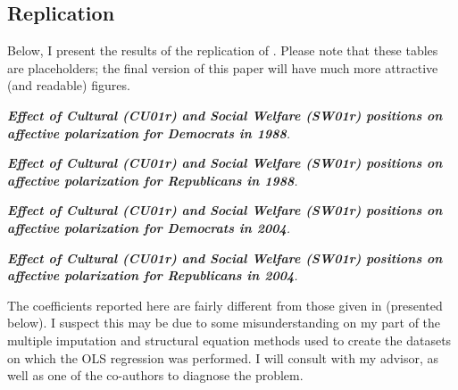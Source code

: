 \documentclass[12pt]{article}
\begin{document}
\subsection{Replication}

Below, I present the results of the replication of \citeauthor{iyengar2012affect}. Please note that these tables are placeholders; the final version of this paper will have much more attractive (and readable) figures.
\begin{table}[H]

\caption{\label{table} \textit{\textbf{Effect of Cultural (CU01r) and Social Welfare (SW01r) positions on affective polarization for Democrats in 1988}.}}
\end{table}

\begin{table}[H]

\caption{\label{table} \textit{\textbf{Effect of Cultural (CU01r) and Social Welfare (SW01r) positions on affective polarization for Republicans in 1988}.}}
\end{table}

\begin{table}[H]

\caption{\label{table} \textit{\textbf{Effect of Cultural (CU01r) and Social Welfare (SW01r) positions on affective polarization for Democrats in 2004}.}}
\end{table}


\begin{table}[H]

\caption{\label{table} \textit{\textbf{Effect of Cultural (CU01r) and Social Welfare (SW01r) positions on affective polarization for Republicans in 2004}.}}
\end{table}

The coefficients reported here are fairly different from those given in \citet{iyengar2012affect} (presented below). I suspect this may be due to some misunderstanding on my part of the multiple imputation and structural equation methods used to create the datasets on which the OLS regression was performed. I will consult with my advisor, as well as one of the co-authors to diagnose the problem.
\end{document}
